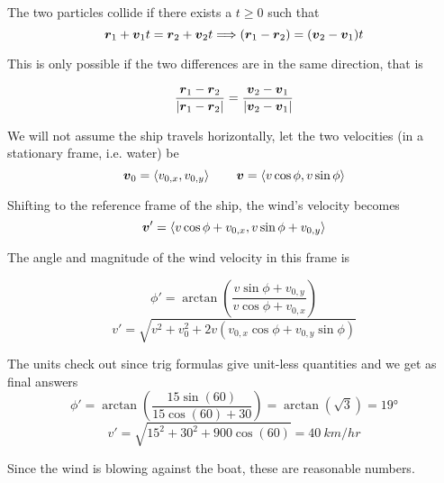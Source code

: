 \begin{exercise}
The two particles collide if there exists a $t \geq 0$ such that
\[ \vec r_1 + \vec v_1 t = \vec r_2 + \vec v_2 t \thus (\vec r_1 - \vec r_2) = (\vec v_2 - \vec v_1) t \]

This is only possible if the two differences are in the same direction, that is
\begin{answer}
	\[ \frac{\vec r_1 - \vec r_2}{\abs{\vec r_1 - \vec r_2}} = \frac{\vec v_2 - \vec v_1}{\abs{\vec v_2 - \vec v_1}}\]
\end{answer}
\end{exercise}


\begin{exercise}
We will not assume the ship travels horizontally, let the two velocities (in a stationary frame, i.e. water) be
\[ \vec v_0 = \vbrack{v_{0,x}, v_{0,y}} \qquad \vec v = \vbrack{v \cos\phi, v\sin\phi} \]

Shifting to the reference frame of the ship, the wind's velocity becomes
\[ \vec v' = \vbrack{v \cos\phi + v_{0,x}, v\sin\phi + v_{0,y}} \]

The angle and magnitude of the wind velocity in this frame is
\begin{answer}
	\[ \phi' = \arctan(\frac{v \sin\phi + v_{0,y}}{v \cos\phi + v_{0,x}}) \]
	\[ v' = \sqrt{v^2 + v_0^2 + 2v(v_{0,x} \cos\phi + v_{0,y}\sin\phi)} \]
\end{answer}

The units check out since trig formulas give unit-less quantities and we get as final answers
\[ \phi' = \arctan(\frac{15\sin(60)}{15\cos(60) + 30}) = \arctan(\sqrt{3}) = \ang{19} \]
\[ v' = \sqrt{15^2 + 30^2 + 900\cos(60)} = \SI{40}{km/hr} \]

Since the wind is blowing against the boat, these are reasonable numbers.
\end{exercise}


